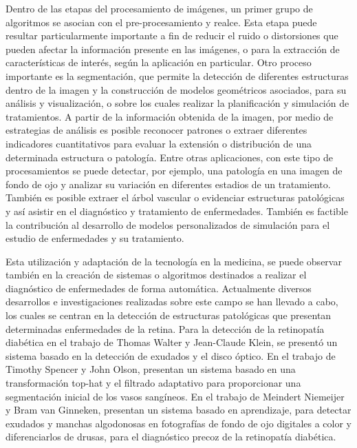 Dentro de las etapas del procesamiento de im\'agenes, un primer grupo de algoritmos se asocian con el pre-procesamiento y realce. Esta etapa puede resultar particularmente importante a fin de reducir el ruido o distorsiones que pueden afectar la informaci\'on presente en las im\'agenes, o para la extracci\'on de caracter\'isticas de inter\'es, seg\'un la aplicaci\'on en particular. Otro proceso importante es la segmentaci\'on, que permite la detecci\'on de diferentes estructuras dentro de la imagen y la construcci\'on de modelos geom\'etricos asociados, para su an\'alisis y visualizaci\'on, o sobre los cuales realizar la planificaci\'on y simulaci\'on de tratamientos. A partir de la informaci\'on obtenida de la imagen, por medio de estrategias de an\'alisis es posible reconocer patrones o extraer diferentes indicadores cuantitativos para evaluar la extensi\'on o distribuci\'on de una determinada estructura o patolog\'ia.
Entre otras aplicaciones, con este tipo de procesamientos se puede detectar, por ejemplo, una patolog\'ia en una imagen de fondo de ojo y analizar su variaci\'on en diferentes estadios de un tratamiento. Tambi\'en es posible extraer el \'arbol vascular o evidenciar estructuras patol\'ogicas y as\'i asistir en el diagn\'ostico y tratamiento de enfermedades. Tambi\'en es factible la contribuci\'on al desarrollo de modelos personalizados de simulaci\'on para el estudio de enfermedades y su tratamiento.

Esta utilizaci\'on y adaptaci\'on de la tecnolog\'ia en la medicina, se puede observar tambi\'en en la creaci\'on de sistemas o algoritmos destinados a realizar el diagn\'ostico de enfermedades de forma autom\'atica. Actualmente diversos desarrollos e investigaciones realizadas sobre este campo se han llevado a cabo, los cuales se centran en la detecci\'on de estructuras patol\'ogicas que presentan determinadas enfermedades de la retina. 
Para la detecci\'on de la retinopat\'ia diab\'etica en el trabajo de Thomas Walter y Jean-Claude Klein,  \cite{walter2002contribution} se present\'o un sistema basado en la detecci\'on de exudados y el disco \'optico. En el trabajo de Timothy Spencer y  John Olson,  \cite{spencer1996image}  presentan un sistema basado en una transformaci\'on top-hat y el filtrado adaptativo para proporcionar una segmentaci\'on inicial de los vasos sang\'ineos. En el trabajo de Meindert Niemeijer y Bram van Ginneken,\cite{frame1998comparison} \cite{niemeijer2007automated} presentan un sistema basado en aprendizaje, para detectar exudados y manchas algodonosas en fotograf\'ias de fondo de ojo digitales a color y diferenciarlos de drusas, para el diagn\'ostico precoz de la retinopat\'ia diab\'etica.\\

